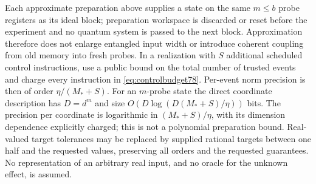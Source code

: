 Each approximate preparation above supplies a state on the same
$m\le b$ probe registers as its ideal block; preparation workspace
is discarded or reset before the experiment and no quantum system
is passed to the next block.  Approximation therefore does not
enlarge entangled input width or introduce coherent coupling from
old memory into fresh probes.  In a realization with $S$ additional
scheduled control instructions, use a public bound on the total
number of trusted events and charge every instruction in
\eqref{eq:controlbudget78}.  Per-event norm precision is then of
order $\eta/(M_*+S)$.  For an $m$-probe state the direct coordinate
description has $D=d^m$ and size
$O(D\log(D(M_*+S)/\eta))$ bits.  The precision per coordinate
is logarithmic in $(M_*+S)/\eta$, with its dimension dependence
explicitly charged; this is not a polynomial preparation bound.
Real-valued target tolerances may be replaced by supplied rational
targets between one half and the requested values, preserving all
orders and the requested guarantees.  No representation of an
arbitrary real input, and no oracle for the unknown effect, is
assumed.
